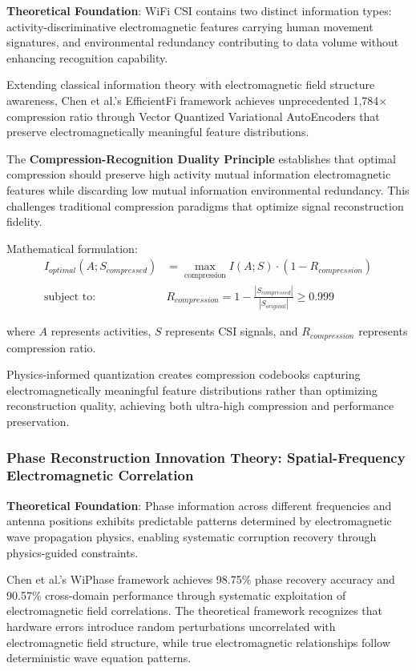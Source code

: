\documentclass[journal]{IEEEtran}
\begin{document}
\textbf{Theoretical Foundation}: WiFi CSI contains two distinct information types: activity-discriminative electromagnetic features carrying human movement signatures, and environmental redundancy contributing to data volume without enhancing recognition capability.

Extending classical information theory \cite{cover1999elements} with electromagnetic field structure awareness, Chen et al.'s EfficientFi framework \cite{chen2024efficientfi} achieves unprecedented 1,784× compression ratio through Vector Quantized Variational AutoEncoders that preserve electromagnetically meaningful feature distributions.

The \textbf{Compression-Recognition Duality Principle} establishes that optimal compression should preserve high activity mutual information electromagnetic features while discarding low mutual information environmental redundancy. This challenges traditional compression paradigms that optimize signal reconstruction fidelity.

Mathematical formulation:
\begin{align}
I_{optimal}(A;S_{compressed}) &= \max_{\text{compression}} I(A;S) \cdot (1-R_{compression}) \\
\text{subject to: } &R_{compression} = 1 - \frac{|S_{compressed}|}{|S_{original}|} \geq 0.999
\end{align}

where $A$ represents activities, $S$ represents CSI signals, and $R_{compression}$ represents compression ratio.

Physics-informed quantization creates compression codebooks capturing electromagnetically meaningful feature distributions rather than optimizing reconstruction quality, achieving both ultra-high compression and performance preservation.

\subsubsection{Phase Reconstruction Innovation Theory: Spatial-Frequency Electromagnetic Correlation}

\textbf{Theoretical Foundation}: Phase information across different frequencies and antenna positions exhibits predictable patterns determined by electromagnetic wave propagation physics, enabling systematic corruption recovery through physics-guided constraints.

Chen et al.'s WiPhase framework \cite{chen2024wiphase} achieves 98.75\% phase recovery accuracy and 90.57\% cross-domain performance through systematic exploitation of electromagnetic field correlations. The theoretical framework recognizes that hardware errors introduce random perturbations uncorrelated with electromagnetic field structure, while true electromagnetic relationships follow deterministic wave equation patterns.
\end{document}
